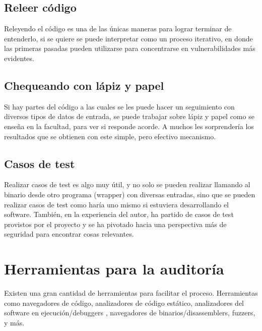 \subsection{Releer código}
Releyendo el código es una de las únicas maneras para lograr terminar de entenderlo, si se quiere se puede interpretar como un proceso iterativo, en donde las primeras pasadas pueden utilizarse para concentrarse en vulnerabilidades más evidentes.


\subsection{Chequeando con lápiz y papel}
Si hay partes del código a las cuales se les puede hacer un seguimiento con diversos tipos de datos de entrada, se puede trabajar sobre lápiz y papel como se enseña en la facultad, para ver si responde acorde. A muchos les sorprendería los resultados que se obtienen con este simple, pero efectivo mecanismo.


\subsection{Casos de test}
Realizar casos de test es algo muy útil, y no solo se pueden realizar llamando al binario desde otro programa (wrapper) con diversas entradas, sino que se pueden realizar casos de test como haría uno mismo si estuviera desarrollando el software. También, en la experiencia del autor, ha partido de casos de test provistos por el proyecto y se ha pivotado hacia una perspectiva más de seguridad para encontrar cosas relevantes.


\section{Herramientas para la auditoría}
Existen una gran cantidad de herramientas para facilitar el proceso. Herramientas como navegadores de código\cite[]{CodeCompassLink}\cite[]{SourceInsightLink}\cite[]{UnderstandLink}\cite[]{SourceTrailLink}, analizadores de código estático\cite{clangLink}\cite[]{coverityLink}\cite[]{cppcheckLink}\cite[]{codesonnarLink}\cite[]{inferLink}\cite[]{awesomeStaticList}, analizadores del software en ejecución/debuggers \cite[]{radare2Link}\cite[]{gdbLink}\cite[]{lldbLink}\cite[]{windbgLink}\cite[]{ollydbgLink}, navegadores de binarios/disassemblers\cite[]{binnaviLink}\cite[]{capstoneLink}\cite[]{idaproLink}\cite[]{binaryninjaLink}\cite[]{ghidraLink}, fuzzers\cite[]{aflLink}\cite[]{radamsaLink}\cite[]{grammarinatorLink}\cite[]{honggfuzzLink}\cite[]{awesomeFuzzlist}, y más.

